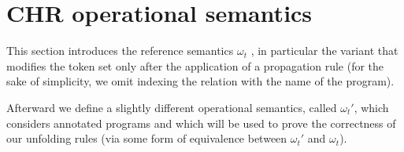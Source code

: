 \documentclass[final]{acmtrans2e}
\begin{document}
\section{CHR operational semantics}\label{sec:semantics}

This section introduces the reference semantics $\omega_t$
\cite{DSGH04}, in particular the variant that modifies the token
set only after the application of a propagation rule (for the sake
of simplicity, we omit indexing the relation with the name of the
program).


Afterward we define a slightly different operational  semantics,
called $\omega_t'$, which considers annotated programs and which
will be used to prove the correctness of our unfolding rules (via some form of
equivalence between  $\omega_t'$ and $\omega_t$).
\end{document}
